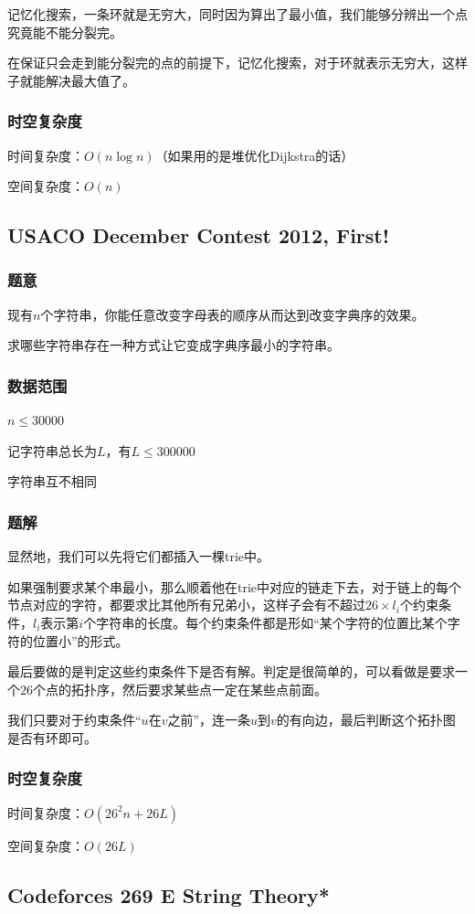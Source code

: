 \documentclass{ctexart}
\begin{document}
记忆化搜索，一条环就是无穷大，同时因为算出了最小值，我们能够分辨出一个点究竟能不能分裂完。

在保证只会走到能分裂完的点的前提下，记忆化搜索，对于环就表示无穷大，这样子就能解决最大值了。
\subsubsection{时空复杂度}
时间复杂度：$O(n \log n)$（如果用的是堆优化Dijkstra的话）

空间复杂度：$O(n)$
\subsection{USACO December Contest 2012, First!}
\subsubsection{题意}
现有$n$个字符串，你能任意改变字母表的顺序从而达到改变字典序的效果。

求哪些字符串存在一种方式让它变成字典序最小的字符串。
\subsubsection{数据范围}
$n \le 30000$

记字符串总长为$L$，有$L \le 300000$

字符串互不相同
\subsubsection{题解}
显然地，我们可以先将它们都插入一棵trie中。

如果强制要求某个串最小，那么顺着他在trie中对应的链走下去，对于链上的每个节点对应的字符，都要求比其他所有兄弟小，这样子会有不超过$26\times l_i$个约束条件，$l_i$表示第$i$个字符串的长度。每个约束条件都是形如“某个字符的位置比某个字符的位置小”的形式。

最后要做的是判定这些约束条件下是否有解。判定是很简单的，可以看做是要求一个$26$个点的拓扑序，然后要求某些点一定在某些点前面。

我们只要对于约束条件“$u$在$v$之前”，连一条$u$到$v$的有向边，最后判断这个拓扑图是否有环即可。
\subsubsection{时空复杂度}
时间复杂度：$O(26^2n+26L)$

空间复杂度：$O(26L)$
\subsection{Codeforces 269 E String Theory*}
\end{document}
